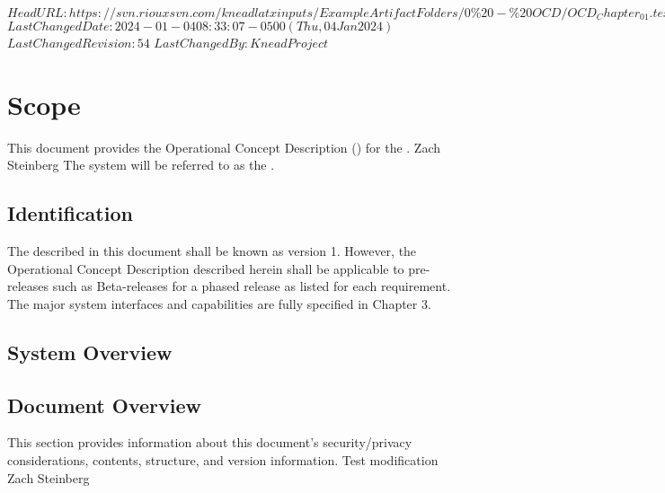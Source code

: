\svnidlong
{$HeadURL: https://svn.riouxsvn.com/kneadlatxinputs/ExampleArtifactFolders/0\%20-\%20OCD/OCD_Chapter_01.tex $}
{$LastChangedDate: 2024-01-04 08:33:07 -0500 (Thu, 04 Jan 2024) $}
{$LastChangedRevision: 54 $}
{$LastChangedBy: KneadProject $}

\chapter{Scope}
\label{chap:Scope}


This document provides the Operational Concept Description (\OCD) for the \ThisSystem. Zach Steinberg
The system will be referred to as the \ThisSys.

\section{Identification}
\label{sec:Identification}


The \ThisSystem described in this document shall be known as \ThisSys version 1.
However, the Operational Concept Description {\OCD} described herein shall be applicable to pre-releases such as Beta-releases for a phased release as listed for each requirement.
The major system interfaces and capabilities are fully specified in Chapter 3.

\section{System Overview}
\label{sec:SystemOverview}







\newpage
\section{Document Overview}
\label{sec:DocumentOverview}


This section provides information about this document's security/privacy considerations, contents, structure, and version information.
Test modification Zach Steinberg






